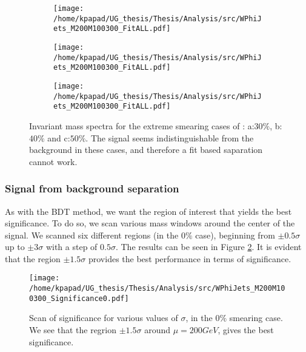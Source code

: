 \begin{figure}[htbp]
\centering
\begin{subfigure}{0.45\textwidth}
\centering
\texttt{[image: /home/kpapad/UG\_thesis/Thesis/Analysis/src/WPhiJets\_M200M100300\_FitALL.pdf]}
\caption{}
\end{subfigure}
\begin{subfigure}{0.45\textwidth}
\centering
\texttt{[image: /home/kpapad/UG\_thesis/Thesis/Analysis/src/WPhiJets\_M200M100300\_FitALL.pdf]}
\caption{}
\end{subfigure}

\begin{subfigure}{0.45\textwidth}
\centering
\texttt{[image: /home/kpapad/UG\_thesis/Thesis/Analysis/src/WPhiJets\_M200M100300\_FitALL.pdf]}
\caption{}
\end{subfigure}
\caption{Invariant mass spectra for the extreme smearing cases of : a:$30\%$, b:$40\%$ and c:$50\%$. The signal seems indistinguishable from the background in these cases, and therefore a fit based saparation cannot work.}
\label{fig:extremeSmearings}
\end{figure}
\subsubsection{Signal from background separation}
\label{sec:org759739a}
\label{sec:Signal_from_background_separation}
As with the BDT method, we want the region of interest that yields the best significance. To do so, we scan various mass windows around the center of the signal. We scanned six different regions (in the \(0\%\) case), beginning from \(\pm 0.5\sigma\) up to \(\pm 3\sigma\) with a step of \(0.5\sigma\). The results can be seen in Figure \ref{fig:Scan0}. It is evident that the region \(\pm 1.5\sigma\) provides the best performance in terms of significance.
\begin{figure}[h]
\centering
\texttt{[image: /home/kpapad/UG\_thesis/Thesis/Analysis/src/WPhiJets\_M200M100300\_Significance0.pdf]}
\caption{Scan of significance for various values of $\sigma$, in the $0\%$ smearing case. We see that the regrion $\pm 1.5\sigma$ around $\mu=200GeV$, gives the best significance.}
\label{fig:Scan0}
\end{figure}

